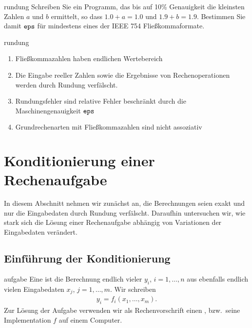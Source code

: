 \begin{Aufgabe}{rundung}
  Schreiben Sie ein Programm, das bis auf 10\% Genauigkeit die
  kleinsten Zahlen $a$ und $b$ ermittelt, so dass $1.0+a=1.0$ und
  $1.9+b=1.9$. Bestimmen Sie damit $\texttt{eps}$ für mindestens eines der
  IEEE 754 Fließkommaformate.
\end{Aufgabe}

\begin{Fazit}{rundung}
  \begin{enumerate}
  \item Fließkommazahlen haben endlichen Wertebereich
  \item Die Eingabe reeller Zahlen sowie die Ergebnisse von
    Rechenoperationen werden durch Rundung verfälscht.
  \item Rundungsfehler sind relative Fehler beschränkt durch die
    Maschinengenauigkeit $\texttt{eps}$
  \item Grundrechenarten mit Fließkommazahlen sind nicht assoziativ
  \end{enumerate}
\end{Fazit}

\section{Konditionierung einer Rechenaufgabe}

\begin{intro}
  In diesem Abschnitt nehmen wir zunächst an, die Berechnungen seien
  exakt und nur die Eingabedaten durch Rundung verfälscht. Daraufhin
  untersuchen wir, wie stark sich die Lösung einer Rechenaufgabe
  abhängig von Variationen der Eingabedaten verändert.
\end{intro}

\subsection{Einführung der Konditionierung}

\begin{Definition}{aufgabe}
  Eine  ist die Berechnung endlich vieler
   $y_i$, $i=1,\dots,n$ aus ebenfalls endlich
  vielen Eingabedaten $x_j$, $j=1,\dots,m$. Wir schreiben
  \begin{gather}
    y_i = f_i(x_1,\dots,x_m).
  \end{gather}
  Zur Lösung der Aufgabe verwenden wir als Rechenvorschrift einen
  , bzw.\ seine Implementation $f$ auf einem Computer.
\end{Definition}

